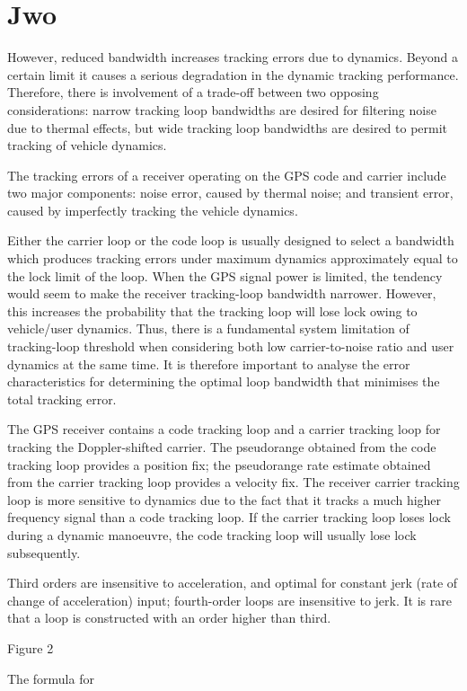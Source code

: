 \section{Jwo}
\cite{Jwo}
However, reduced bandwidth increases
tracking errors due to dynamics. Beyond a certain limit it causes a serious degradation in the
dynamic tracking performance. Therefore, there is involvement of a trade-off between two
opposing considerations: narrow tracking loop bandwidths are desired for filtering noise due to
thermal effects, but wide tracking loop bandwidths are desired to permit tracking of vehicle
dynamics.

The tracking errors of a receiver operating on the GPS code
and carrier include two major components: noise error,
caused by thermal noise; and transient error, caused by
imperfectly tracking the vehicle dynamics.


Either the carrier loop or the code loop is usually
designed to select a bandwidth which produces tracking
errors under maximum dynamics approximately equal to
the lock limit of the loop. When the GPS signal power is
limited, the tendency would seem to make the receiver
tracking-loop bandwidth narrower. However, this increases
the probability that the tracking loop will lose lock owing
to vehicle/user dynamics. Thus, there is a fundamental
system limitation of tracking-loop threshold when considering
both low carrier-to-noise ratio and user dynamics at
the same time. It is therefore important to analyse the error
characteristics for determining the optimal loop bandwidth
that minimises the total tracking error.

The GPS receiver contains a code tracking loop and a
carrier tracking loop for tracking the Doppler-shifted
carrier. The pseudorange obtained from the code tracking
loop provides a position fix; the pseudorange rate estimate
obtained from the carrier tracking loop provides a velocity
fix. The receiver carrier tracking loop is more sensitive to
dynamics due to the fact that it tracks a much higher
frequency signal than a code tracking loop. If the carrier
tracking loop loses lock during a dynamic manoeuvre, the
code tracking loop will usually lose lock subsequently.

Third orders are insensitive
to acceleration, and optimal for constant jerk (rate of change of acceleration) input; fourth-order loops are insensitive
to jerk. It is rare that a loop is constructed with an
order higher than third.

Figure 2

The formula for 

